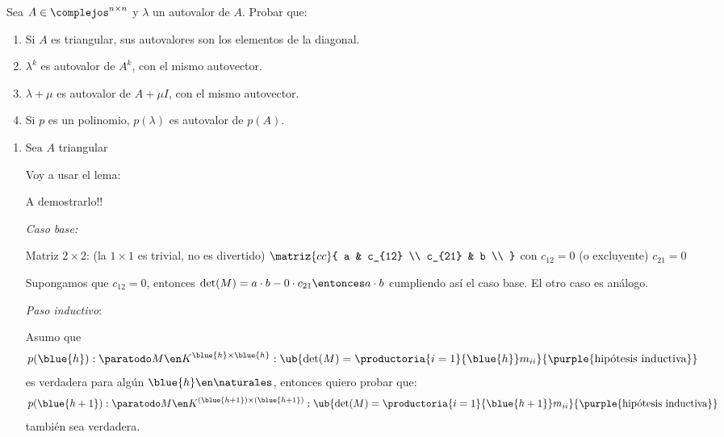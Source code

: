 \begin{enunciado}{\ejercicio}
  Sea $A \in \complejos^{n \times n}$ y $\lambda$ un autovalor de $A$. Probar que:
  \begin{enumerate}[label=(\alph*)]
    \item Si $A$ es triangular, sus autovalores son los elementos de la diagonal.
    \item $\lambda^k$ es autovalor de $A^k$, con el mismo autovector.
    \item $\lambda + \mu$ es autovalor de $A + \mu I$, con el mismo autovector.
    \item Si $p$ es un polinomio, $p(\lambda)$ es autovalor de $p(A)$.
  \end{enumerate}
\end{enunciado}

\begin{enumerate}[label=(\alph*)]
  \item
        Sea $A$ triangular

        Voy a usar el lema:

        A demostrarlo!!

        \textit{Caso base:}

        Matriz $2 \times2$: (la $1 \times 1$ es trivial, no es divertido)
        $
          \matriz{cc}{
            a      & c_{12} \\
            c_{21} & b      \\
          }
        $
        con $c_{12} = 0$ (o excluyente) $c_{21} = 0$

        Supongamos que $c_{12} = 0$, entonces $\det(M) = a \cdot b - 0 \cdot c_{21} \entonces a \cdot b$ cumpliendo así el caso base.
        El otro caso es análogo.

        \textit{Paso inductivo}:

        Asumo que
        $$
          p(\blue{h}) : \paratodo M \en K^{\blue{h} \times \blue{h}}: \ub{\det(M) = \productoria{i=1}{\blue{h}} m_{ii}}{\text{\purple{hipótesis inductiva}}}
        $$
        es verdadera para algún $\blue{h} \en \naturales$, entonces quiero probar que:
        $$
          p(\blue{h+1}) :
          \paratodo M \en K^{(\blue{h+1}) \times (\blue{h+1})}: \ub{\det(M) = \productoria{i=1}{\blue{h+1}} m_{ii}}{\text{\purple{hipótesis inductiva}}}
        $$
        también sea verdadera.


\end{enumerate}
